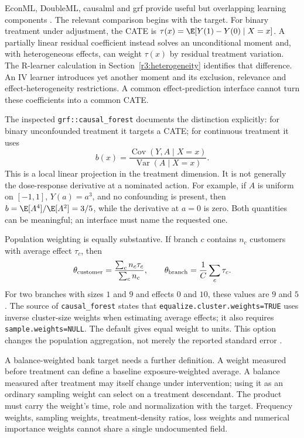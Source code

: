 EconML, DoubleML, causalml and grf provide useful but overlapping learning
components \citep{sw_econml,sw_doubleml,sw_causalml,sw_grf}. The relevant
comparison begins with the target. For binary treatment under adjustment,
the CATE is $\tau(x)=\E[Y(1)-Y(0)\mid X=x]$. A partially linear residual
coefficient instead solves an unconditional moment and, with heterogeneous
effects, can weight $\tau(x)$ by residual treatment variation. The
R-learner calculation in Section~\ref{r3:heterogeneity} identifies that
difference. An IV learner introduces yet another moment and its exclusion,
relevance and effect-heterogeneity restrictions. A common effect-prediction
interface cannot turn these coefficients into a common CATE.

The inspected \texttt{grf::causal\_forest} documents the distinction
explicitly: for binary unconfounded treatment it targets a CATE; for
continuous treatment it uses
\[
 b(x)=\frac{\operatorname{Cov}(Y,A\mid X=x)}
                 {\operatorname{Var}(A\mid X=x)}.
\]
This is a local linear projection in the treatment dimension. It is not
generally the dose-response derivative at a nominated action. For example,
if $A$ is uniform on $[-1,1]$, $Y(a)=a^3$, and no confounding is present,
then $b=\E[A^4]/\E[A^2]=3/5$, while the derivative at $a=0$ is zero.
Both quantities can be meaningful; an interface must name the requested one.

Population weighting is equally substantive. If branch $c$ contains $n_c$
customers with average effect $\tau_c$, then
\[
 \theta_{\rm customer}=
 \frac{\sum_c n_c\tau_c}{\sum_c n_c},
 \qquad
 \theta_{\rm branch}=\frac1C\sum_c\tau_c.
\]
For two branches with sizes $1$ and $9$ and effects $0$ and $10$, these
values are $9$ and $5$. The source of \texttt{causal\_forest} states that
\texttt{equalize.cluster.weights=TRUE} uses inverse cluster-size weights
when estimating average effects; it also requires
\texttt{sample.weights=NULL}. The default gives equal weight to units.
This option changes the population aggregation, not merely the reported
standard error \citep{sw_grf}.

A balance-weighted bank target needs a further definition. A weight
measured before treatment can define a baseline exposure-weighted average.
A balance measured after treatment may itself change under intervention;
using it as an ordinary sampling weight can select on a treatment
descendant. The product must carry the weight's time, role and normalization
with the target. Frequency weights, sampling weights, treatment-density
ratios, loss weights and numerical importance weights cannot share a
single undocumented field.

